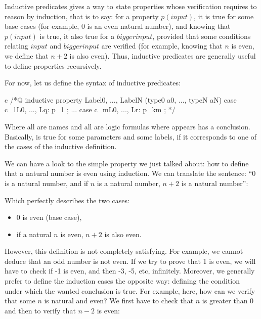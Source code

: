 Inductive predicates gives a way to state properties whose verification requires
to reason by induction, that is to say: for a property $p(input)$, it is true
for some base cases (for example, $0$ is an even natural number), and knowing
that $p(input)$ is true, it also true for a $bigger input$, provided that some
conditions relating $input$ and $bigger input$ are verified (for example, knowing
that $n$ is even, we define that $n+2$ is also even). Thus, inductive predicates
are generally useful to define properties recursively.


For now, let us define the syntax of inductive predicates:

\begin{CodeBlock}{c}
/*@
  inductive property{ Label0, ..., LabelN }(type0 a0, ..., typeN aN) {
  case c_1{L0, ..., Lq}: p_1 ;
  ...
  case c_m{L0, ..., Lr}: p_km ;
  }
*/
\end{CodeBlock}

Where all  are names and all  are logic
formulas where  appears has a conclusion. Basically,
 is true for some parameters and some labels, if it
corresponds to one of the cases of the inductive definition.

We can have a look to the simple property we just talked about: how to define
that a natural number is even using induction. We can translate the sentence:
``0 is a natural number, and if $n$ is a natural number, $n+2$ is a natural
number'':






Which perfectly describes the two cases:
\begin{itemize}
\item $0$ is even (base case),
\item if a natural $n$ is even, $n+2$ is also even.
\end{itemize}
  
However, this definition is not completely satisfying. For example, we cannot
deduce that an odd number is not even. If we try to prove that 1 is even, we
will have to check if -1 is even, and then -3, -5, etc, infinitely. Moreover,
we generally prefer to define the induction cases the opposite way: defining
the condition under which the wanted conclusion is true. For example, here,
how can we verify that some $n$ is natural and even? We first have to check that
$n$ is greater than $0$ and then to verify that $n-2$ is even:




